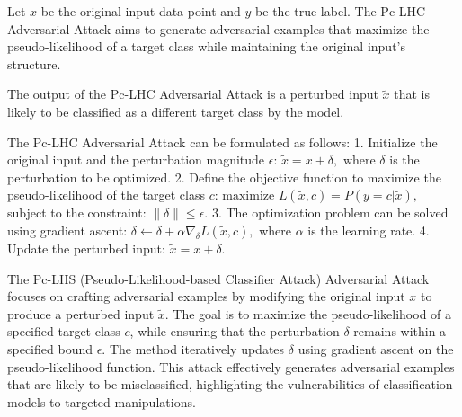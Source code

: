 Let \( x \) be the original input data point and \( y \) be the true label. The Pc-LHC Adversarial Attack aims to generate adversarial examples that maximize the pseudo-likelihood of a target class while maintaining the original input's structure.

The output of the Pc-LHC Adversarial Attack is a perturbed input \( \tilde{x} \) that is likely to be classified as a different target class by the model.

The Pc-LHC Adversarial Attack can be formulated as follows:
1. Initialize the original input and the perturbation magnitude \( \epsilon \):
   $
   \tilde{x} = x + \delta,
   $
   where \( \delta \) is the perturbation to be optimized.
2. Define the objective function to maximize the pseudo-likelihood of the target class \( c \):
   $
   \text{maximize } L(\tilde{x}, c) = P(y = c | \tilde{x}),
   $
   subject to the constraint:
   $
   \|\delta\| \leq \epsilon.
   $
3. The optimization problem can be solved using gradient ascent:
   $
   \delta \leftarrow \delta + \alpha \nabla_{\delta} L(\tilde{x}, c),
   $
   where \( \alpha \) is the learning rate.
4. Update the perturbed input:
   $
   \tilde{x} = x + \delta.
   $

The Pc-LHS (Pseudo-Likelihood-based Classifier Attack) Adversarial Attack focuses on crafting adversarial examples by modifying the original input \( x \) to produce a perturbed input \( \tilde{x} \). The goal is to maximize the pseudo-likelihood of a specified target class \( c \), while ensuring that the perturbation \( \delta \) remains within a specified bound \( \epsilon \). The method iteratively updates \( \delta \) using gradient ascent on the pseudo-likelihood function. This attack effectively generates adversarial examples that are likely to be misclassified, highlighting the vulnerabilities of classification models to targeted manipulations.
